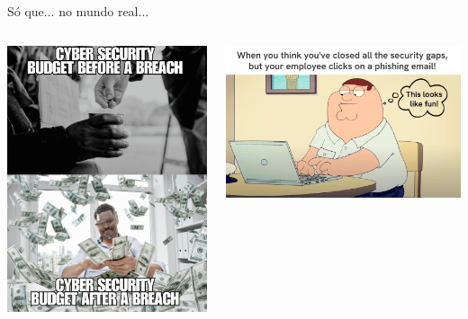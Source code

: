 \begin{frame}{Só que... no mundo real...}
    \centering
    \begin{columns}
        \begin{column}{0.48\linewidth}
            \includegraphics[width=0.8\linewidth]{Figuras/budget-seguranca-antes-depois.png}

        \end{column}
        \begin{column}{0.48\linewidth}
            \includegraphics[width=\linewidth]{Figuras/empregado-clicou-errado.png}
        \end{column}
    \end{columns}


\end{frame}


